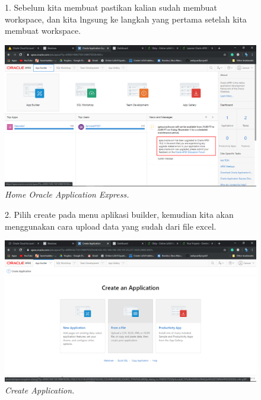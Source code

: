 \begin{enumerate}
    \begin{figure}[!htbp]
    \item[1.] Sebelum kita membuat pastikan kalian sudah membuat workspace, dan kita lngsung ke langkah yang pertama setelah kita membuat workspace.
        \begin{center}
        \includegraphics[scale=0.3]{figures/Screenshot(71).png}
        \caption{\textit{Home Oracle Application Express.}}
        \end{center}   
    \end{figure}
    
    \begin{figure}[!htbp]
    \item[2.] Pilih create pada menu aplikasi builder, kemudian kita akan menggunakan cara upload data yang sudah dari file excel.
        \begin{center}
        \includegraphics[scale=0.3]{figures/Screenshot(72).png}
        \caption{\textit{Create Application.}}
        \end{center}   
    \end{figure}


\end{enumerate}
